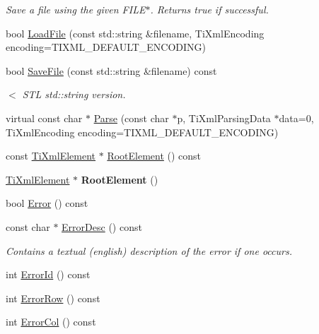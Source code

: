 \begin{DoxyCompactItemize}
\begin{DoxyCompactList}\small\item\em Save a file using the given FILE$\ast$. Returns true if successful. \item\end{DoxyCompactList}\item 
bool \hyperlink{class_ti_xml_document_a18ae6ed34fed7991ebc220862dfac884}{LoadFile} (const std::string \&filename, TiXmlEncoding encoding=TIXML\_\-DEFAULT\_\-ENCODING)
\item 
\hypertarget{class_ti_xml_document_a3d4fae0463f3f03679ba0b7cf6f2df52}{
bool \hyperlink{class_ti_xml_document_a3d4fae0463f3f03679ba0b7cf6f2df52}{SaveFile} (const std::string \&filename) const }
\label{class_ti_xml_document_a3d4fae0463f3f03679ba0b7cf6f2df52}

\begin{DoxyCompactList}\small\item\em $<$ STL std::string version. \item\end{DoxyCompactList}\item 
virtual const char $\ast$ \hyperlink{class_ti_xml_document_a17ebabe36926ef398e78dec0d0ad0378}{Parse} (const char $\ast$p, TiXmlParsingData $\ast$data=0, TiXmlEncoding encoding=TIXML\_\-DEFAULT\_\-ENCODING)
\item 
const \hyperlink{class_ti_xml_element}{TiXmlElement} $\ast$ \hyperlink{class_ti_xml_document_ad09d17927f908f40efb406af2fb873be}{RootElement} () const 
\item 
\hypertarget{class_ti_xml_document_a0b43e762a23f938b06651bc90b8a1013}{
\hyperlink{class_ti_xml_element}{TiXmlElement} $\ast$ {\bfseries RootElement} ()}
\label{class_ti_xml_document_a0b43e762a23f938b06651bc90b8a1013}

\item 
bool \hyperlink{class_ti_xml_document_a6dfc01a6e5d58e56acd537dfd3bdeb29}{Error} () const 
\item 
\hypertarget{class_ti_xml_document_a9d0f689f6e09ea494ea547be8d79c25e}{
const char $\ast$ \hyperlink{class_ti_xml_document_a9d0f689f6e09ea494ea547be8d79c25e}{ErrorDesc} () const }
\label{class_ti_xml_document_a9d0f689f6e09ea494ea547be8d79c25e}

\begin{DoxyCompactList}\small\item\em Contains a textual (english) description of the error if one occurs. \item\end{DoxyCompactList}\item 
int \hyperlink{class_ti_xml_document_af96fc2f3f9ec6422782bfe916c9e778f}{ErrorId} () const 
\item 
int \hyperlink{class_ti_xml_document_af30efc75e804aa2e92fb8be3a8cb676e}{ErrorRow} () const 
\item 
\hypertarget{class_ti_xml_document_aa90bc630ee5203c6109ca5fad3323649}{
int \hyperlink{class_ti_xml_document_aa90bc630ee5203c6109ca5fad3323649}{ErrorCol} () const }
\label{class_ti_xml_document_aa90bc630ee5203c6109ca5fad3323649}


\end{DoxyCompactItemize}

